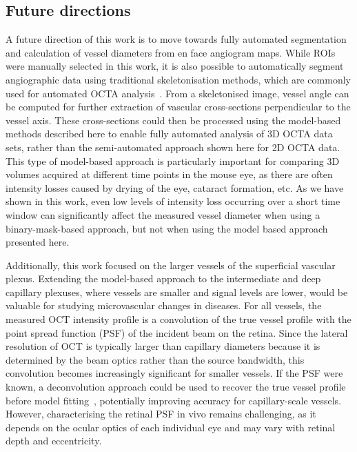\subsection{Future directions}
\label{subsec:future_direction}
A future direction of this work is to move towards fully automated segmentation and calculation of vessel diameters from en face angiogram maps. While ROIs were manually selected in this work, it is also possible to automatically segment angiographic data using traditional skeletonisation methods, which are commonly used for automated OCTA analysis~\cite{chuQuantitativeAssessmentRetinal2016,untrachtTowardsStandardisingRetinal2024,weiAutomaticVesselDiameter2020}. From a skeletonised image, vessel angle can be computed for further extraction of vascular cross-sections perpendicular to the vessel axis. These cross-sections could then be processed using the model-based methods described here to enable fully automated analysis of 3D OCTA data sets, rather than the semi-automated approach shown here for 2D OCTA data. This type of model-based approach is particularly important for comparing 3D volumes acquired at different time points in the mouse eye, as there are often intensity losses caused by drying of the eye, cataract formation, etc. As we have shown in this work, even low levels of intensity loss occurring over a short time window can significantly affect the measured vessel diameter when using a binary-mask-based approach, but not when using the model based approach presented here.

Additionally, this work focused on the larger vessels of the superficial vascular plexus. Extending the model-based approach to the intermediate and deep capillary plexuses, where vessels are smaller and signal levels are lower, would be valuable for studying microvascular changes in diseases. For all vessels, the measured OCT intensity profile is a convolution of the true vessel profile with the point spread function (PSF) of the incident beam on the retina. Since the lateral resolution of OCT is typically larger than capillary diameters because it is determined by the beam optics rather than the source bandwidth, this convolution becomes increasingly significant for smaller vessels. If the PSF were known, a deconvolution approach could be used to recover the true vessel profile before model fitting~\cite{abbasiDeconvolutionTechniquesOCT2025}, potentially improving accuracy for capillary-scale vessels. However, characterising the retinal PSF in vivo remains challenging, as it depends on the ocular optics of each individual eye and may vary with retinal depth and eccentricity.


